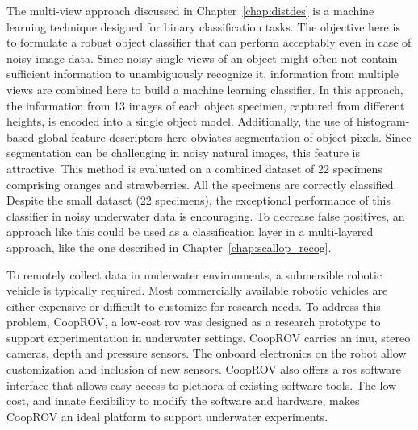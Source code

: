 The multi-view approach discussed in Chapter~\ref{chap:distdes} is a machine learning 
technique designed for binary classification tasks. 
The objective here is to formulate a robust object classifier that can perform acceptably even in case of noisy image data.
Since noisy single-views of an object might often not contain sufficient information to unambiguously recognize it, information from multiple views are combined 
here to build a machine learning classifier. 
In this approach, the information from 13 images of each object specimen, captured from different heights, is encoded into a single object model.
Additionally, the use of histogram-based global feature descriptors here obviates segmentation of object pixels. Since segmentation can be challenging in noisy natural images, this feature is attractive. This method is evaluated on a combined dataset of 22 specimens comprising oranges and strawberries.
All the specimens are correctly classified. Despite the small dataset (22 specimens), the exceptional performance of this classifier in noisy underwater data is encouraging. To decrease false positives, an approach like this could be used as a classification layer in a multi-layered approach, like the one described in Chapter~\ref{chap:scallop_recog}.

To remotely collect data in underwater environments, a submersible robotic vehicle is typically required.
Most commercially available robotic vehicles are either expensive or difficult to customize for research needs. To address this problem, CoopROV, a low-cost \gls{rov} was designed as a research prototype to support experimentation in underwater settings. CoopROV carries an \gls{imu}, stereo cameras, depth and pressure sensors. The onboard electronics on the robot allow customization and inclusion of new sensors. CoopROV also offers a \gls{ros} software interface that allows easy access to plethora of existing software tools. The low-cost, and innate flexibility to modify the software and hardware, makes CoopROV an ideal platform to support underwater experiments.

